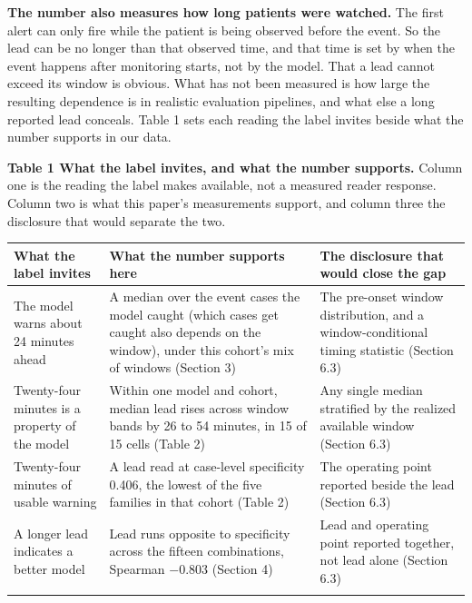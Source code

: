 \textbf{The number also measures how long patients were watched.} The first alert can only fire
while the patient is being observed before the event. So the lead can be no longer than that
observed time, and that time is set by when the event happens after monitoring starts, not by the
model. That a lead cannot exceed its window is obvious. What has not been measured is
how large the resulting dependence is in realistic evaluation pipelines, and what else a long
reported lead conceals. Table 1 sets
each reading the label invites beside what the number supports in our data.

\begin{table}[H]
\textbf{Table 1 \textbar{} What the label invites, and what the number supports.} Column one is the reading
the label makes available, not a measured reader response. Column two is what this paper's
measurements support, and column three the disclosure that would separate the two.

\vspace{0.4em}
\centering\footnotesize
\begin{tabular}{@{}
  >{\raggedright\arraybackslash}p{}
  >{\raggedright\arraybackslash}p{}
  >{\raggedright\arraybackslash}p{}@{}}
\toprule\noalign{}
\begin{minipage}[b]{\linewidth}\raggedright
What the label invites
\end{minipage} & \begin{minipage}[b]{\linewidth}\raggedright
What the number supports here
\end{minipage} & \begin{minipage}[b]{\linewidth}\raggedright
The disclosure that would close the gap
\end{minipage} \\
\midrule\noalign{}
\bottomrule\noalign{}
The model warns about 24 minutes ahead & A median over the event cases the model caught (which cases get caught also depends on the window), under this cohort's mix of windows (Section 3) & The pre-onset window distribution, and a window-conditional timing statistic (Section 6.3) \\
Twenty-four minutes is a property of the model & Within one model and cohort, median lead rises across window bands by 26 to 54 minutes, in 15 of 15 cells (Table 2) & Any single median stratified by the realized available window (Section 6.3) \\
Twenty-four minutes of usable warning & A lead read at case-level specificity 0.406, the lowest of the five families in that cohort (Table 2) & The operating point reported beside the lead (Section 6.3) \\
A longer lead indicates a better model & Lead runs opposite to specificity across the fifteen combinations, Spearman $-$0.803 (Section 4) & Lead and operating point reported together, not lead alone (Section 6.3) \\
\bottomrule\noalign{}
\end{tabular}
\end{table}


